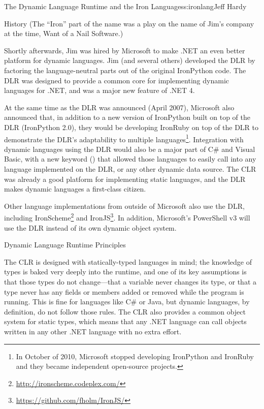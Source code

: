 \begin{aosachapter}{The Dynamic Language Runtime and the Iron Languages}{s:ironlang}{Jeff Hardy}
\begin{aosasect1}{History}
\noindent
(The ``Iron'' part of the name was a play on the name of Jim's company at the
time, Want of a Nail Software.)

Shortly afterwards, Jim was hired by Microsoft to make .NET an even better
platform for dynamic languages. Jim (and several others) developed the DLR by
factoring the language-neutral parts out of the original IronPython code. The
DLR was designed to provide a common core for implementing dynamic languages
for .NET, and was a major new feature of .NET 4.

At the same time as the DLR was announced (April 2007), Microsoft also
announced that, in addition to a new version of IronPython built on top of the
DLR (IronPython 2.0), they would be developing IronRuby on top of the DLR
to demonstrate the DLR's adaptability to multiple languages\footnote{In October
of 2010, Microsoft stopped developing IronPython and IronRuby and they became
independent open-source projects.}. Integration with dynamic languages using
the DLR would also be a major part of C\# and Visual Basic, with a new keyword
() that allowed those languages to easily call into any language
implemented on the DLR, or any other dynamic data source. The CLR was already a
good platform for implementing static languages, and the DLR makes dynamic
languages a first-class citizen.

Other language implementations from outside of Microsoft also use the DLR,
including IronScheme\footnote{\url{http://ironscheme.codeplex.com/}} and
IronJS\footnote{\url{https://github.com/fholm/IronJS/}}. In addition,
Microsoft's PowerShell v3 will use the DLR instead of its own dynamic object
system.

\end{aosasect1}

\begin{aosasect1}{Dynamic Language Runtime Principles}

The CLR is designed with statically-typed languages in mind; the knowledge of
types is baked very deeply into the runtime, and one of its key assumptions is
that those types do not change---that a variable never changes its type, or
that a type never has any fields or members added or removed while the program
is running. This is fine for languages like C\# or Java, but dynamic languages,
by definition, do not follow those rules. The CLR also provides a common object
system for static types, which means that any .NET language can call objects
written in any other .NET language with no extra effort.


\end{aosasect1}
\end{aosachapter}
